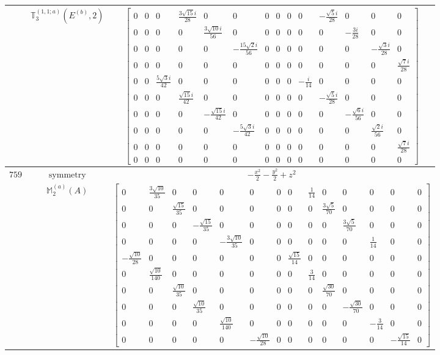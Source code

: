 \documentclass[fleqn,8pt,landscape]{jsarticle}
\begin{document}
\begin{longtable}{ccc}
$  $ & $ \mathbb{T}_{3}^{(1,1;a)}(E^{(b)},2) $ & $ \begin{bmatrix} 0 & 0 & 0 & \frac{3 \sqrt{15} i}{28} & 0 & 0 & 0 & 0 & 0 & 0 & - \frac{\sqrt{5} i}{28} & 0 & 0 & 0 \\ 0 & 0 & 0 & 0 & \frac{3 \sqrt{10} i}{56} & 0 & 0 & 0 & 0 & 0 & 0 & - \frac{3 i}{28} & 0 & 0 \\ 0 & 0 & 0 & 0 & 0 & - \frac{15 \sqrt{2} i}{56} & 0 & 0 & 0 & 0 & 0 & 0 & - \frac{\sqrt{3} i}{28} & 0 \\ 0 & 0 & 0 & 0 & 0 & 0 & 0 & 0 & 0 & 0 & 0 & 0 & 0 & \frac{\sqrt{7} i}{28} \\ 0 & 0 & \frac{5 \sqrt{3} i}{42} & 0 & 0 & 0 & 0 & 0 & 0 & - \frac{i}{14} & 0 & 0 & 0 & 0 \\ 0 & 0 & 0 & \frac{\sqrt{15} i}{42} & 0 & 0 & 0 & 0 & 0 & 0 & - \frac{\sqrt{5} i}{28} & 0 & 0 & 0 \\ 0 & 0 & 0 & 0 & - \frac{\sqrt{15} i}{42} & 0 & 0 & 0 & 0 & 0 & 0 & - \frac{\sqrt{6} i}{56} & 0 & 0 \\ 0 & 0 & 0 & 0 & 0 & - \frac{5 \sqrt{3} i}{42} & 0 & 0 & 0 & 0 & 0 & 0 & \frac{\sqrt{2} i}{56} & 0 \\ 0 & 0 & 0 & 0 & 0 & 0 & 0 & 0 & 0 & 0 & 0 & 0 & 0 & \frac{\sqrt{7} i}{28} \\ 0 & 0 & 0 & 0 & 0 & 0 & 0 & 0 & 0 & 0 & 0 & 0 & 0 & 0 \end{bmatrix} $ \\ \hline
$ 759 $ & $ \text{symmetry} $ & $ - \frac{x^{2}}{2} - \frac{y^{2}}{2} + z^{2} $ \\
$  $ & $ \mathbb{M}_{2}^{(a)}(A) $ & $ \begin{bmatrix} 0 & \frac{3 \sqrt{10}}{35} & 0 & 0 & 0 & 0 & 0 & 0 & \frac{1}{14} & 0 & 0 & 0 & 0 & 0 \\ 0 & 0 & \frac{\sqrt{15}}{35} & 0 & 0 & 0 & 0 & 0 & 0 & \frac{3 \sqrt{5}}{70} & 0 & 0 & 0 & 0 \\ 0 & 0 & 0 & - \frac{\sqrt{15}}{35} & 0 & 0 & 0 & 0 & 0 & 0 & \frac{3 \sqrt{5}}{70} & 0 & 0 & 0 \\ 0 & 0 & 0 & 0 & - \frac{3 \sqrt{10}}{35} & 0 & 0 & 0 & 0 & 0 & 0 & \frac{1}{14} & 0 & 0 \\ - \frac{\sqrt{10}}{28} & 0 & 0 & 0 & 0 & 0 & 0 & \frac{\sqrt{15}}{14} & 0 & 0 & 0 & 0 & 0 & 0 \\ 0 & \frac{\sqrt{10}}{140} & 0 & 0 & 0 & 0 & 0 & 0 & \frac{3}{14} & 0 & 0 & 0 & 0 & 0 \\ 0 & 0 & \frac{\sqrt{10}}{35} & 0 & 0 & 0 & 0 & 0 & 0 & \frac{\sqrt{30}}{70} & 0 & 0 & 0 & 0 \\ 0 & 0 & 0 & \frac{\sqrt{10}}{35} & 0 & 0 & 0 & 0 & 0 & 0 & - \frac{\sqrt{30}}{70} & 0 & 0 & 0 \\ 0 & 0 & 0 & 0 & \frac{\sqrt{10}}{140} & 0 & 0 & 0 & 0 & 0 & 0 & - \frac{3}{14} & 0 & 0 \\ 0 & 0 & 0 & 0 & 0 & - \frac{\sqrt{10}}{28} & 0 & 0 & 0 & 0 & 0 & 0 & - \frac{\sqrt{15}}{14} & 0 \end{bmatrix} $ \\ \hline

\end{longtable}
\end{document}
